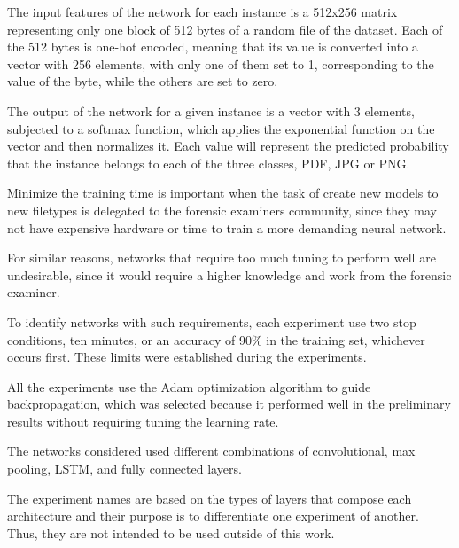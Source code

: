 
The input features of the network for each instance is a 512x256 matrix representing only one block of 512 bytes of a random file of the dataset. Each of the 512 bytes is one-hot encoded, meaning that its value is converted into a vector with 256 elements, with only one of them set to 1, corresponding to the value of the byte, while the others are set to zero.

The output of the network for a given instance is a vector with 3 elements, subjected to a softmax function, which applies the exponential function on the vector and then normalizes it. Each value will represent the predicted probability that the instance belongs to each of the three classes, PDF, JPG or PNG.

Minimize the training time is important when the task of create new models to new filetypes is delegated to the forensic examiners community, since they may not have expensive hardware or time to train a more demanding neural network.

For similar reasons, networks that require too much tuning to perform well are undesirable, since it would require a higher knowledge and work from the forensic examiner.


To identify networks with such requirements, each experiment use two stop conditions, ten minutes, or an accuracy of 90\% in the training set, whichever occurs first. These limits were established during the experiments.


All the experiments use the Adam \cite{kingma_adam:_2014}
optimization algorithm to guide backpropagation, which was selected because it performed well in the preliminary results without requiring tuning the learning rate.

The networks considered used different combinations of convolutional, max pooling, LSTM, and fully connected layers.

The experiment names are based on the types of layers that compose each architecture and their purpose is to differentiate one experiment of another. Thus, they are not intended to be used outside of this work.


